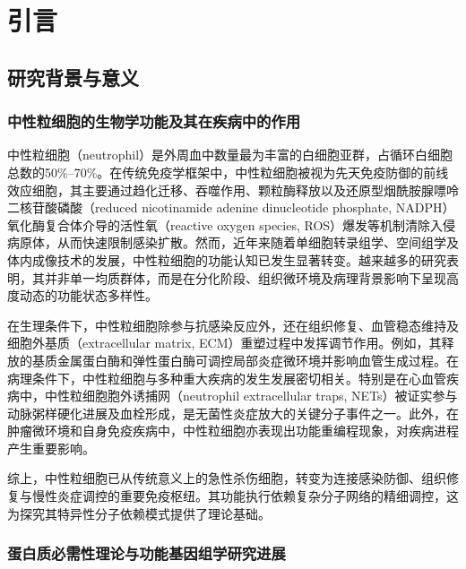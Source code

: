 
\chapter{引言}

\section{研究背景与意义}

\subsection{中性粒细胞的生物学功能及其在疾病中的作用}

中性粒细胞（neutrophil）是外周血中数量最为丰富的白细胞亚群，占循环白细胞总数的50\%--70\%\cite{maierbegandt2024neutrophils}。在传统免疫学框架中，中性粒细胞被视为先天免疫防御的前线效应细胞，其主要通过趋化迁移、吞噬作用、颗粒酶释放以及还原型烟酰胺腺嘌呤二核苷酸磷酸（reduced nicotinamide adenine dinucleotide phosphate, NADPH）氧化酶复合体介导的活性氧（reactive oxygen species, ROS）爆发等机制清除入侵病原体，从而快速限制感染扩散\cite{mayadas2014multifaceted}。然而，近年来随着单细胞转录组学、空间组学及体内成像技术的发展，中性粒细胞的功能认知已发生显著转变。越来越多的研究表明，其并非单一均质群体，而是在分化阶段、组织微环境及病理背景影响下呈现高度动态的功能状态多样性\cite{arocacrevilln2024neutrophils}。

在生理条件下，中性粒细胞除参与抗感染反应外，还在组织修复、血管稳态维持及细胞外基质（extracellular matrix, ECM）重塑过程中发挥调节作用。例如，其释放的基质金属蛋白酶和弹性蛋白酶可调控局部炎症微环境并影响血管生成过程\cite{rosales2018neutrophil}。在病理条件下，中性粒细胞与多种重大疾病的发生发展密切相关。特别是在心血管疾病中，中性粒细胞胞外诱捕网（neutrophil extracellular traps, NETs）被证实参与动脉粥样硬化进展及血栓形成，是无菌性炎症放大的关键分子事件之一\cite{baaten2024netosis}。此外，在肿瘤微环境和自身免疫疾病中，中性粒细胞亦表现出功能重编程现象，对疾病进程产生重要影响。

综上，中性粒细胞已从传统意义上的急性杀伤细胞，转变为连接感染防御、组织修复与慢性炎症调控的重要免疫枢纽。其功能执行依赖复杂分子网络的精细调控，这为探究其特异性分子依赖模式提供了理论基础。

\subsection{蛋白质必需性理论与功能基因组学研究进展}

